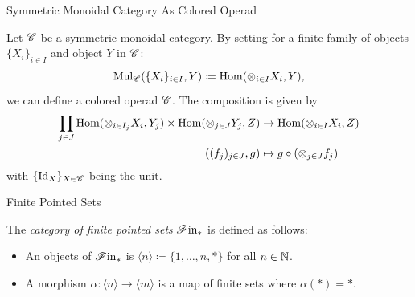 \begin{frame}{Symmetric Monoidal Category As Colored Operad}
  \small{\begin{eg}
 Let $\mathscr{C}$ be a symmetric monoidal category. By setting for a finite
        family of objects $\{X_i\}_{i \in I}$ and object $Y$ in $\mathscr{C}$:
        \[
            \operatorname{Mul}_{\mathscr{C}}(\{X_i\}_{i \in I}, Y) \coloneqq \operatorname{Hom}(\otimes_{i \in I} X_i, Y),
        \]
        we can define a colored operad $\mathscr{C}$. The composition is given by
        \begin{align*}
            \prod_{j \in J} \operatorname{Hom}(\otimes_{i \in I_j} X_i, Y_j) \times \operatorname{Hom}(\otimes_{j \in J} Y_j, Z) &\to \operatorname{Hom}(\otimes_{i \in I} X_i, Z) \\
            ((f_j)_{j \in J}, g) &\mapsto g \circ (\otimes_{j \in J} f_j) \\
        \end{align*}
        with $\{ \operatorname{Id}_X\}_{X \in \mathscr{C}}$ being the unit.
      \end{eg}}
\end{frame}

\begin{frame}{Finite Pointed Sets}
    \begin{defin}
        The {\em category of finite pointed sets} $\mathscr{F} \text{in}_{\ast}$ is defined as
        follows:
        \begin{itemize}
            \item An objects of $\mathscr{F} \text{in}_{\ast}$ is $ 
            \langle n \rangle \coloneqq \{1, \dots, n, \ast\} $ for all $n \in \mathbb{N}$.
            \item A morphism $\alpha \colon \langle n \rangle \to \langle m
            \rangle$ is a map of finite sets where $\alpha(*)=*$.
        \end{itemize}
    \end{defin}
\end{frame}

